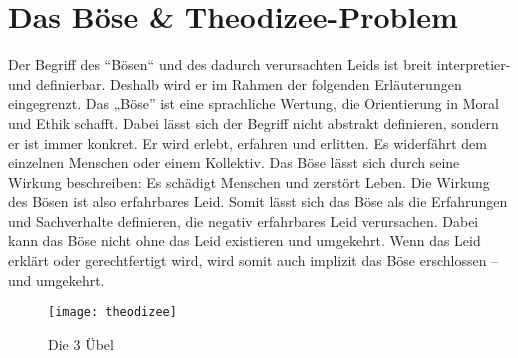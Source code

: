 \chapter{Das Böse \& Theodizee-Problem}\label{sec:Theodizee}
Der Begriff des ``Bösen`` und des dadurch verursachten Leids ist breit interpretier- und definierbar. Deshalb wird er im Rahmen der folgenden Erläuterungen eingegrenzt. Das „Böse” ist eine sprachliche Wertung, die Orientierung in Moral und Ethik schafft. Dabei lässt sich der Begriff nicht abstrakt definieren, sondern er ist immer konkret. Er wird erlebt, erfahren und erlitten. Es widerfährt dem einzelnen Menschen oder einem Kollektiv. Das Böse lässt sich durch seine Wirkung beschreiben: Es schädigt Menschen und zerstört Leben. Die Wirkung des Bösen ist also erfahrbares Leid. Somit lässt sich das Böse als die Erfahrungen und Sachverhalte definieren, die negativ erfahrbares Leid verursachen. Dabei kann das Böse nicht ohne das Leid existieren und umgekehrt. Wenn das Leid erklärt oder gerechtfertigt wird, wird somit auch implizit das Böse erschlossen – und umgekehrt.\\

\begin{wrapfigure}[20]{l}{0.45\linewidth}
    \begin{center}
        \texttt{[image: theodizee]}
        \caption{Die 3 Übel}\label{fig:theodizee}
    \end{center}
\end{wrapfigure}


